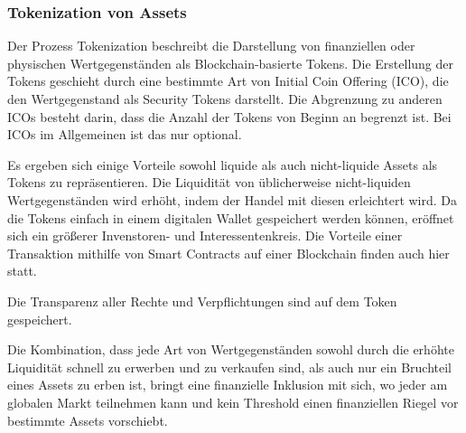 \subsubsection{Tokenization von Assets}
\label{sec:Tokenization}
Der Prozess \glqq Tokenization\grqq{} beschreibt die Darstellung von finanziellen oder physischen
Wertgegenständen als Blockchain-basierte Tokens. Die Erstellung der Tokens geschieht durch 
eine bestimmte Art von Initial Coin Offering (ICO), die den Wertgegenstand als Security Tokens 
darstellt.
\cite[p.~82]{gupta2020tokenization}
Die Abgrenzung zu anderen ICOs besteht darin, dass die Anzahl der Tokens von Beginn an begrenzt ist.
Bei ICOs im Allgemeinen ist das nur optional.
\cite[p.66]{fill2020blockchain}

Es ergeben sich einige Vorteile sowohl liquide als auch nicht-liquide Assets als Tokens zu 
repräsentieren.
Die Liquidität von üblicherweise nicht-liquiden Wertgegenständen wird erhöht, indem der Handel mit
diesen erleichtert wird. 
Da die Tokens einfach in einem digitalen Wallet gespeichert werden können, eröffnet sich ein größerer 
Invenstoren- und Interessentenkreis. 
Die Vorteile einer Transaktion mithilfe von Smart Contracts auf einer Blockchain finden auch hier 
statt. %

Die Transparenz aller Rechte und Verpflichtungen sind auf dem Token gespeichert.

\cite[p.~82]{gupta2020tokenization}

Die Kombination, dass jede Art von Wertgegenständen sowohl durch die erhöhte Liquidität schnell zu erwerben 
und zu verkaufen sind, als auch nur ein Bruchteil eines Assets zu erben ist, bringt eine 
finanzielle Inklusion mit sich, wo jeder am globalen Markt teilnehmen kann und kein Threshold einen
finanziellen Riegel vor bestimmte Assets vorschiebt.
\cite[p.~167]{chowdhary2025smart}











